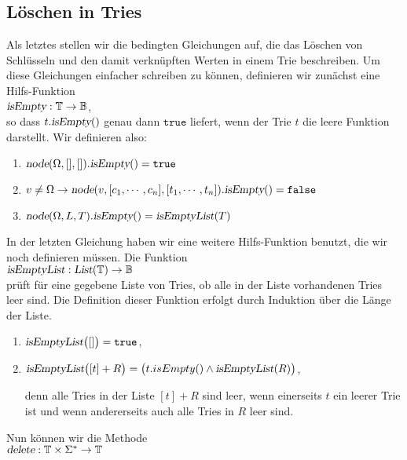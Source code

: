 \subsection{L\"oschen in Tries}
Als letztes stellen wir die bedingten Gleichungen auf, die das L\"oschen von
Schl\"usseln und den damit verkn\"upften Werten in einem Trie beschreiben.
Um diese Gleichungen einfacher schreiben zu k\"onnen, definieren wir zun\"achst eine
Hilfs-Funktion \\[0.2cm]
\hspace*{1.3cm} $\textsl{isEmpty}: \mathbb{T} \rightarrow \mathbb{B}$, \\[0.2cm]
so dass $t.\textsl{isEmpty}()$ genau dann $\mathtt{true}$ liefert, wenn der Trie
$t$ die leere Funktion darstellt.  Wir definieren also: 
\begin{enumerate}
\item $\textsl{node}(\Omega, [],[]).\textsl{isEmpty}() = \mathtt{true}$
\item $v \not= \Omega \rightarrow 
       \textsl{node}(v, [c_1,\cdots,c_n],[t_1,\cdots,t_n]).\textsl{isEmpty}() = \mathtt{false}$
\item $\textsl{node}(\Omega, L, T).\textsl{isEmpty}() = \textsl{isEmptyList}(T)$
\end{enumerate}
In der letzten Gleichung haben wir eine weitere Hilfs-Funktion benutzt, die wir noch
definieren m\"ussen.  Die Funktion
\\[0.2cm]
\hspace*{1.3cm}
$\textsl{isEmptyList}: \textsl{List}(\mathbb{T}) \rightarrow \mathbb{B}$
\\[0.2cm]
pr\"uft f\"ur eine gegebene Liste von Tries, ob alle in der Liste vorhandenen Tries leer sind.
Die Definition dieser Funktion erfolgt durch Induktion \"uber die L\"ange der Liste.
\begin{enumerate}
\item $\textsl{isEmptyList}\bigl([]\bigr) = \mathtt{true}$,
\item $\textsl{isEmptyList}\bigl([t] + R\bigr) = 
       \bigl(t.isEmpty() \wedge \textsl{isEmptyList}(R)\bigr)$,

      denn alle Tries in der Liste $[t]+R$ sind leer, wenn einerseits $t$ ein leerer
      Trie ist und wenn andererseits auch alle Tries in $R$ leer sind.
\end{enumerate}
Nun k\"onnen wir die Methode
\\[0.2cm]
\hspace*{1.3cm}
$\textsl{delete}: \mathbb{T} \times \Sigma^* \rightarrow \mathbb{T}$
